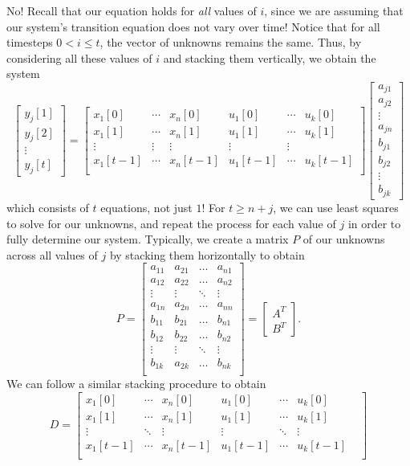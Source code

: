 \documentclass[letterpaper]{article}
\theoremstyle{remark}
\newcommand{\mat}[1]{\ensuremath{\begin{bmatrix}#1\end{bmatrix}}}
\begin{document}
No! Recall that our equation holds for \emph{all} values of $i$, since we are assuming that our system's transition equation does not vary over time! Notice that for all timesteps $0 < i \le t$, the vector of unknowns remains the same. Thus, by considering all these values of $i$ and stacking them vertically, we obtain the system
\[
    \mat{
        y_j[1] \\
        y_j[2] \\
        \vdots \\
        y_j[t]
    } = \mat{
        x_1[0] & \cdots & x_n[0] & u_1[0] & \cdots & u_k[0] \\
        x_1[1] & \cdots & x_n[1] & u_1[1] & \cdots & u_k[1] \\
        \vdots & \vdots & \vdots & \vdots & \vdots & \\
        x_1[t - 1] & \cdots & x_n[t - 1] & u_1[t - 1] & \cdots & u_k[t - 1] \\
    } \mat{a_{j1} \\ a_{j2} \\ \vdots \\ a_{jn} \\ b_{j1} \\ b_{j2} \\ \vdots \\ b_{jk}}
\]
which consists of $t$ equations, not just $1$! For $t \ge n + j$, we can use least squares to solve for our unknowns, and repeat the process for each value of $j$ in order to fully determine our system. Typically, we create a matrix $P$ of our unknowns across all values of $j$ by stacking them horizontally to obtain
\[
    P = \mat{
    a_{11} & a_{21} & \ldots & a_{n1} \\ 
    a_{12} & a_{22} & \ldots & a_{n2} \\ 
    \vdots & \vdots & \ddots & \vdots \\
    a_{1n} & a_{2n} & \ldots & a_{nn} \\ 
    b_{11} & b_{21} & \ldots & b_{n1} \\ 
    b_{12} & b_{22} & \ldots & b_{n2} \\ 
    \vdots & \vdots & \ddots & \vdots \\
    b_{1k} & a_{2k} & \ldots & b_{nk} \\
    } = \mat{A^T \\ B^T}.
\]
We can follow a similar stacking procedure to obtain
\[
    D = \mat{
        x_1[0] & \cdots & x_n[0] & u_1[0] & \cdots & u_k[0] \\
        x_1[1] & \cdots & x_n[1] & u_1[1] & \cdots & u_k[1] \\
        \vdots & \ddots & \vdots & \vdots & \ddots & \vdots & \\
        x_1[t - 1] & \cdots & x_n[t - 1] & u_1[t - 1] & \cdots & u_k[t - 1] \\
    }
\]
\end{document}
